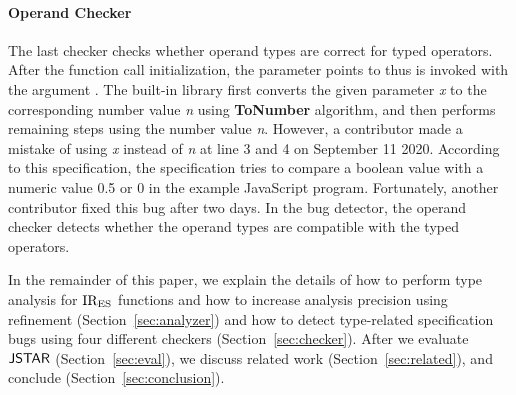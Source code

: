 \paragraph{Operand Checker} The last checker checks whether operand types are
correct for typed operators.  After the function call initialization, the
parameter  points to  thus  is invoked
with the argument .  The  built-in library
first converts the given parameter \textit{x} to the corresponding number value
\textit{n} using \textbf{ToNumber} algorithm, and then performs remaining steps
using the number value \textit{n}.  However, a contributor made a mistake of
using \textit{x} instead of \textit{n} at line 3 and 4 on September 11 2020.
According to this specification, the specification tries to compare a boolean
value  with a numeric value 0.5 or 0 in the example JavaScript
program.  Fortunately, another contributor fixed this bug after two days.  In
the bug detector, the operand checker detects whether the operand types are
compatible with the typed operators.

In the remainder of this paper, we explain the details of how to perform type
analysis for ${\text{IR}_\text{ES}}$ functions and how to increase analysis precision using
refinement (Section~\ref{sec:analyzer}) and how to detect type-related
specification bugs using four different checkers (Section~\ref{sec:checker}).
After we evaluate $\tool$ (Section~\ref{sec:eval}), we discuss related work
(Section~\ref{sec:related}), and conclude (Section~\ref{sec:conclusion}).
